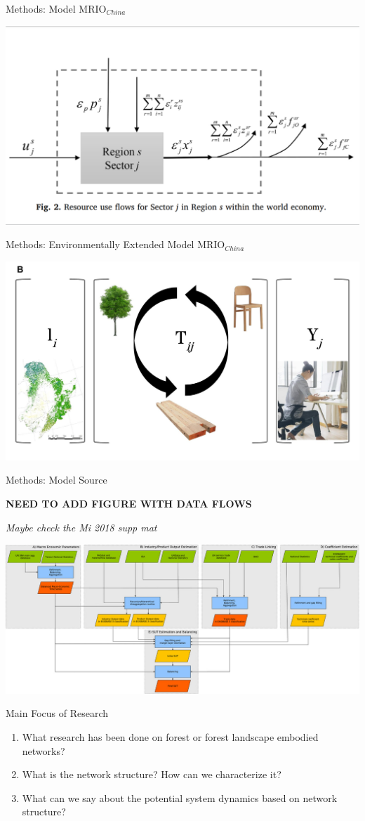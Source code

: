 \documentclass[aspectratio=169]{beamer}
\begin{document}
\begin{frame}{Methods: Model MRIO\(_{China}\)}

\begin{center}\includegraphics[width=0.5\linewidth]{images/Wu_2018_Fig2} \end{center}

\end{frame}

\begin{frame}{Methods: Environmentally Extended Model MRIO\(_{China}\)}

\begin{center}\includegraphics[width=0.5\linewidth]{images/china_eemrio} \end{center}

\end{frame}

\begin{frame}{Methods: Model Source}

\textbf{NEED TO ADD FIGURE WITH DATA FLOWS}

\emph{Maybe check the Mi 2018 supp mat}

\begin{center}\includegraphics[width=0.5\linewidth]{images/exiobase3} \end{center}

\end{frame}

\begin{frame}{Main Focus of Research}

\begin{enumerate}
\item
  What research has been done on forest or forest landscape embodied
  networks?
\item
  What is the network structure? How can we characterize it?
\item
  What can we say about the potential system dynamics based on network
  structure?
\end{enumerate}

\end{frame}
\end{document}
